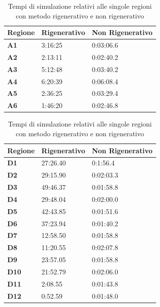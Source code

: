 \begin{table}[h]
  \centering
  \resizebox{\textwidth}{!} {
  \begin{tabular}[t]{ |l|l|l| }
	\hline
	\textbf{Regione}	&		\textbf{Rigenerativo}	&		\textbf{Non Rigenerativo}	\\ \hline
	\textbf{A1} 		&		3:16:25					&		0:03:06.6			\\ \hline
	\textbf{A2}			 &		2:13:11 				&		0:02:40.2		\\ \hline
	\textbf{A3}			 &		5:12:48 				&		0:03:40.2		\\ \hline
	\textbf{A4}			 &		6:20:39 				&		0:06:08.4			\\ \hline
	\textbf{A5}			 &		2:36:25 				&		0:03:29.4		\\ \hline
	\textbf{A6}			 &		1:46:20 				&		0:02:46.8		\\ \hline

  \end{tabular}
  
  \begin{tabular}[t]{ |l|l|l| }
	 	\hline
	\textbf{Regione}	&		\textbf{Rigenerativo}	&		\textbf{Non Rigenerativo}	\\ \hline
	\textbf{D1} 		&		27:26.40				&		0:1:56.4			\\ \hline
	\textbf{D2}		&		29:15.90 				&		0:02:03.3		\\ \hline
	\textbf{D3}		 &		49:46.37 				&		0:01:58.8		\\ \hline
	\textbf{D4}		 &		29:48.04 				&		0:02:00.0			\\ \hline
	\textbf{D5}		 &		42:43.85 				&		0:01:51.6		\\ \hline
	\textbf{D6}		 &		37:23.94 				&		0:01:40.2		\\ \hline
	\textbf{D7}		 &		12:58.50 				&		0:01:58.8		\\ \hline
	\textbf{D8}		 &		11:20.55 				&		0:02:07.8		\\ \hline
	\textbf{D9}		 &		23:57.05 				&		0:01:58.8		\\ \hline
	\textbf{D10}	 &		21:52.79 				&		0:02:06.0		\\ \hline
	\textbf{D11}	 &		2:08.55 				&		0:01:43.8		\\ \hline
	\textbf{D12}	 &		0:52.59 				&		0:01:48.0		\\ \hline
	
	
  \end{tabular}
  }
  \caption{Tempi di simulazione relativi alle singole regioni con metodo rigenerativo e non rigenerativo}
  \label{tab:tabelle-dati-simulazioni}
\end{table}
 
